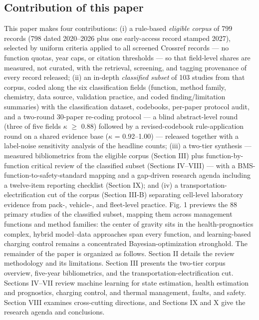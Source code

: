 \documentclass[journal]{IEEEtran}
\begin{document}
\subsection{Contribution of this paper}

This paper makes four contributions: (i) a rule-based \textit{eligible corpus} of 799 records (798 dated 2020--2026 plus one early-access record stamped 2027), selected by uniform criteria applied to all screened Crossref records --- no function quotas, year caps, or citation thresholds --- so that field-level shares are measured, not curated, with the retrieval, screening, and tagging provenance of every record released; (ii) an in-depth \textit{classified subset} of 103 studies from that corpus, coded along the six classification fields (function, method family, chemistry, data source, validation practice, and coded finding/limitation summaries) with the classification dataset, codebooks, per-paper protocol audit, and a two-round 30-paper re-coding protocol --- a blind abstract-level round (three of five fields $\kappa$ $\ge$ 0.88) followed by a revised-codebook rule-application round on a shared evidence base ($\kappa$ = 0.92--1.00) --- released together with a label-noise sensitivity analysis of the headline counts; (iii) a two-tier synthesis --- measured bibliometrics from the eligible corpus (Section III) plus function-by-function critical review of the classified subset (Sections IV--VIII) --- with a BMS-function-to-safety-standard mapping and a gap-driven research agenda including a twelve-item reporting checklist (Section IX); and (iv) a transportation-electrification cut of the corpus (Section III-B) separating cell-level laboratory evidence from pack-, vehicle-, and fleet-level practice. Fig. 1 previews the 88 primary studies of the classified subset, mapping them across management functions and method families: the center of gravity sits in the health-prognostics complex, hybrid model--data approaches span every function, and learning-based charging control remains a concentrated Bayesian-optimization stronghold. The remainder of the paper is organized as follows. Section II details the review methodology and its limitations. Section III presents the two-tier corpus overview, five-year bibliometrics, and the transportation-electrification cut. Sections IV--VII review machine learning for state estimation, health estimation and prognostics, charging control, and thermal management, faults, and safety. Section VIII examines cross-cutting directions, and Sections IX and X give the research agenda and conclusions.
\end{document}
